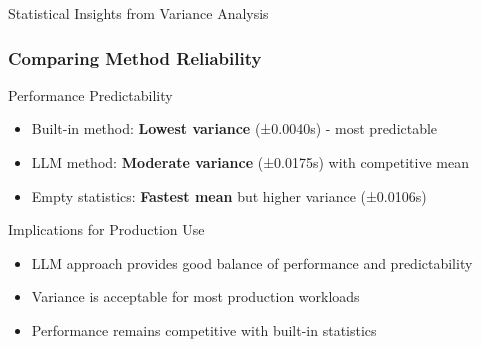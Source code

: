 \documentclass{beamer}
\begin{document}
\begin{frame}{Statistical Insights from Variance Analysis}
\frametitle{Comparing Method Reliability}

\begin{block}{Performance Predictability}
\begin{itemize}
    \item Built-in method: \textbf{Lowest variance} (±0.0040s) - most predictable
    \item LLM method: \textbf{Moderate variance} (±0.0175s) with competitive mean
    \item Empty statistics: \textbf{Fastest mean} but higher variance (±0.0106s)
\end{itemize}
\end{block}

\begin{block}{Implications for Production Use}
\begin{itemize}
    \item LLM approach provides good balance of performance and predictability
    \item Variance is acceptable for most production workloads
    \item Performance remains competitive with built-in statistics
\end{itemize}
\end{block}

\end{frame}
\end{document}
